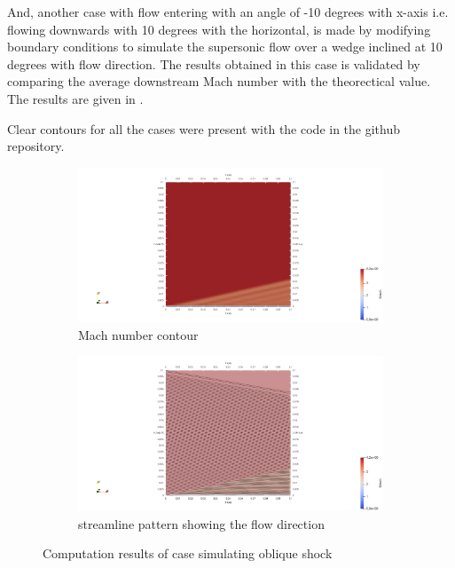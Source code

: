 \documentclass[conf]{new-aiaa}
\begin{document}
\par And, another case with flow entering with an angle of -10 degrees with x-axis i.e.
flowing downwards with 10 degrees with the horizontal, is made by modifying
boundary conditions to simulate the supersonic flow over a wedge inclined at 10 degrees with
flow direction. The results obtained in this case is validated by comparing the
average downstream Mach number with the theorectical value. The results are
given in .

\par Clear contours for all the cases were present with the code in the github
repository.

\begin{figure}[!htb]
    \centering
    \begin{subfigure}{0.75\textwidth}
        \includegraphics[width=\textwidth]{supportingFiles/solution_files_obliqueShock/oblique_shock_10_mach.png}
        \caption{Mach number contour}
    \end{subfigure}
    \hfill
    \begin{subfigure}{0.75\textwidth}
        \includegraphics[width=\textwidth]{supportingFiles/solution_files_obliqueShock/streamlines_obliqueshock.png}
        \caption{streamline pattern showing the flow direction}
    \end{subfigure}
    \caption{Computation results of case simulating oblique shock}
    \label{results_os}
\end{figure}
\end{document}
